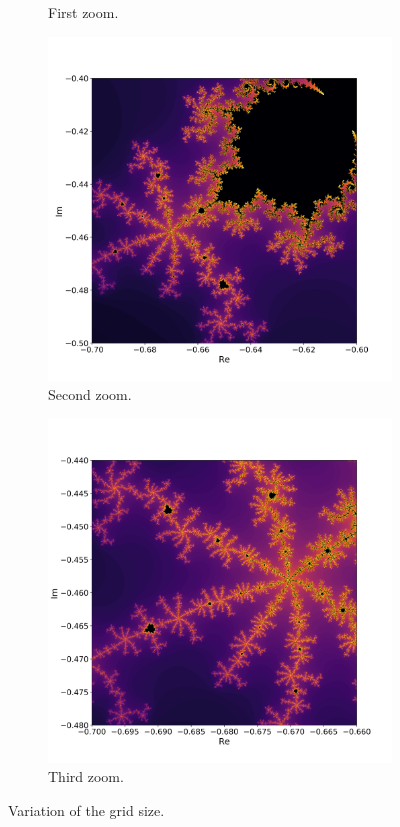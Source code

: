 \documentclass[
  12pt,					%
  a4paper,				%
  twoside,				%
]{report}
\begin{document}
\begin{figure}[H]
\begin{subfigure}{.45\textwidth}
  \caption{First zoom.}
\end{subfigure}
\begin{subfigure}{.45\textwidth}
  \centering
  \includegraphics[width=\linewidth]{IMG/GridSize3.png}
  \caption{Second zoom.}
\end{subfigure}
\begin{subfigure}{.45\textwidth}
  \centering
  \includegraphics[width=\linewidth]{IMG/GridSize4.png}
  \caption{Third zoom.}
\end{subfigure}
\caption{Variation of the grid size.}
\label{FIG_GridSize}
\end{figure}
\end{document}
